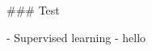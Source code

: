 \documentclass[../thesis-proposal/main.tex]{subfiles}
\begin{document}
\begin{markdown}

### Test

- Supervised learning 
- hello

\end{markdown}
\end{document}
